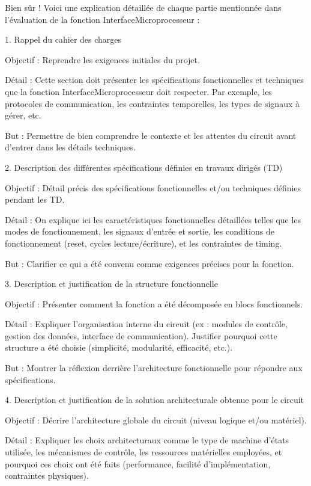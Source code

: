 Bien sûr ! Voici une explication détaillée de chaque partie mentionnée dans l’évaluation de la fonction InterfaceMicroprocesseur :

1. Rappel du cahier des charges

Objectif : Reprendre les exigences initiales du projet.

Détail : Cette section doit présenter les spécifications fonctionnelles et techniques que la fonction InterfaceMicroprocesseur doit respecter. Par exemple, les protocoles de communication, les contraintes temporelles, les types de signaux à gérer, etc.

But : Permettre de bien comprendre le contexte et les attentes du circuit avant d’entrer dans les détails techniques.

2. Description des différentes spécifications définies en travaux dirigés (TD)

Objectif : Détail précis des spécifications fonctionnelles et/ou techniques définies pendant les TD.

Détail : On explique ici les caractéristiques fonctionnelles détaillées telles que les modes de fonctionnement, les signaux d’entrée et sortie, les conditions de fonctionnement (reset, cycles lecture/écriture), et les contraintes de timing.

But : Clarifier ce qui a été convenu comme exigences précises pour la fonction.

3. Description et justification de la structure fonctionnelle

Objectif : Présenter comment la fonction a été décomposée en blocs fonctionnels.

Détail : Expliquer l’organisation interne du circuit (ex : modules de contrôle, gestion des données, interface de communication). Justifier pourquoi cette structure a été choisie (simplicité, modularité, efficacité, etc.).

But : Montrer la réflexion derrière l’architecture fonctionnelle pour répondre aux spécifications.

4. Description et justification de la solution architecturale obtenue pour le circuit

Objectif : Décrire l’architecture globale du circuit (niveau logique et/ou matériel).

Détail : Expliquer les choix architecturaux comme le type de machine d’états utilisée, les mécanismes de contrôle, les ressources matérielles employées, et pourquoi ces choix ont été faits (performance, facilité d’implémentation, contraintes physiques).

